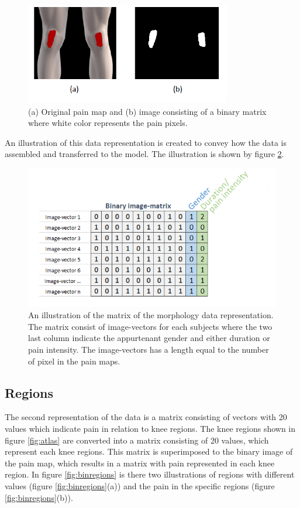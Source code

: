 \begin{figure} [H]
\centering
\includegraphics[width=0.8\textwidth]{figures/cropbin7}
\caption{(a) Original pain map and (b) image consisting of a binary matrix where white color represents the pain pixels.}
\label{fig:cropbin7}
\end{figure}

\noindent
An illustration of this data representation is created to convey how the data is assembled and transferred to the model. The illustration is shown by figure \ref{fig:binmatrix}.

\begin{figure} [H]
\centering
\includegraphics[width=1\textwidth]{figures/binaryimagematrix}
\caption{An illustration of the matrix of the morphology data representation. The matrix consist of image-vectors for each subjects where the two last column indicate the appurtenant gender and either duration or pain intensity. The image-vectors has a length equal to the number of pixel in the pain maps.}
\label{fig:binmatrix}
\end{figure}


\subsection{Regions}
The second representation of the data is a matrix consisting of vectors with 20 values which indicate pain in relation to knee regions. 
The knee regions shown in figure \ref{fig:atlas} are converted into a matrix consisting of 20 values, which represent each knee regions. This matrix is superimposed to the binary image of the pain map, which results in a matrix with pain represented in each knee region. In figure \ref{fig:binregions} is there two illustrations of regions with different values (figure \ref{fig:binregions}(a)) and the pain in the specific regions (figure \ref{fig:binregions}(b)).

